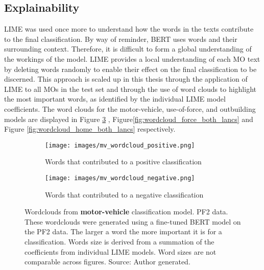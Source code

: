 \subsection{Explainability} LIME was used once more to understand how the words in the texts contribute to the final classification. By way of reminder, BERT uses words and their surrounding context. Therefore, it is difficult to form a global understanding of the workings of the model. LIME provides a local understanding of each MO text by deleting words randomly to enable their effect on the final classification to be discerned. This approach is scaled up in this thesis through the application of LIME to all MOs in the test set and through the use of word clouds to highlight the most important words, as identified by the individual LIME model coefficients. The word clouds for the motor-vehicle, use-of-force, and outbuilding models are displayed in Figure \ref{fig:wordcloud_mv_both_lancs} , Figure\ref{fig:wordcloud_force_both_lancs} and Figure \ref{fig:wordcloud_home_both_lancs} respectively.

\begin{figure}
     \centering
     \begin{subfigure}[b]{0.9\textwidth}
         \centering
         \texttt{[image: images/mv\_wordcloud\_positive.png]}
         \caption{Words that contributed to a positive classification}
         \label{fig: wordcloud_mv_lancs}
     \end{subfigure}
     \vfill
     \begin{subfigure}[b]{0.9\textwidth}
         \centering
         \texttt{[image: images/mv\_wordcloud\_negative.png]}
         \caption{Words that contributed to a negative classification}
         \label{fig: wordcloud_mv_rev_lancs}
     \end{subfigure}
        \caption[Wordclouds from  \textbf{motor-vehicle} classification model. PF2 data.]{{Wordclouds from  \textbf{motor-vehicle} classification model. PF2 data.} These wordclouds were generated using a fine-tuned BERT model on the PF2 data. The larger a word the more important it is for a classification. Words size is derived from a summation of the coefficients from individual LIME models. Word sizes are not comparable across figures. Source: Author generated.}
        \label{fig:wordcloud_mv_both_lancs}
        
\end{figure}


